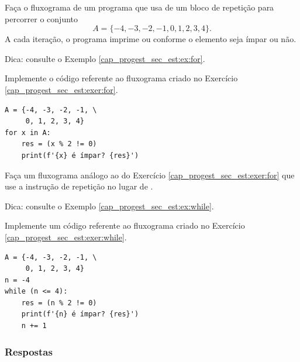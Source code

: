 \begin{exer}\label{cap_progest_sec_est:exer:for}
  Faça o fluxograma de um programa que usa de um bloco de repetição {\PYTHONfor} para percorrer o conjunto
  \begin{equation}
    A = \{-4, -3, -2, -1, 0, 1, 2, 3, 4\}.
  \end{equation}
  A cada iteração, o programa imprime {\PYTHONTrue} ou {\PYTHONFalse} conforme o elemento seja ímpar ou não.
\end{exer}
\begin{resp}
  Dica: consulte o Exemplo \ref{cap_progest_sec_est:ex:for}.
\end{resp}

\begin{exer}
  Implemente o código referente ao fluxograma criado no Exercício \ref{cap_progest_sec_est:exer:for}.
\end{exer}
\begin{resp}

\begin{lstlisting}
A = {-4, -3, -2, -1, \
     0, 1, 2, 3, 4}
for x in A:
    res = (x % 2 != 0)
    print(f'{x} é ímpar? {res}')
\end{lstlisting}

\end{resp}

\begin{exer}\label{cap_progest_sec_est:exer:while}
  Faça um fluxograma análogo ao do Exercício \ref{cap_progest_sec_est:exer:for} que use a instrução de repetição {\PYTHONwhile} no lugar de {\PYTHONfor}.
\end{exer}
\begin{resp}
  Dica: consulte o Exemplo \ref{cap_progest_sec_est:ex:while}.
\end{resp}

\begin{exer}
  Implemente um código referente ao fluxograma criado no Exercício \ref{cap_progest_sec_est:exer:while}.
\end{exer}
\begin{resp}

\begin{lstlisting}
A = {-4, -3, -2, -1, \
     0, 1, 2, 3, 4}
n = -4
while (n <= 4):
    res = (n % 2 != 0)
    print(f'{n} é ímpar? {res}')
    n += 1
\end{lstlisting}

\end{resp}

\ifisbook
\subsubsection{Respostas}
\shipoutAnswer
\fi


